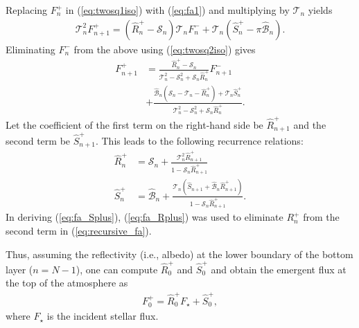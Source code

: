 Replacing $F_n^+$ in (\ref{eq:twosq1iso}) with (\ref{eq:fa1}) and multiplying by $\mathcal{T}_n$ yields
\begin{align}
    \mathcal{T}_n^2 F_{n+1}^+ = (\hat{R}_n^+ - \mathcal{S}_n) \mathcal{T}_n F_n^- + \mathcal{T}_n (\hat{S}_n^+ - \pi \hat{\mathcal{B}}_n).
\end{align}
Eliminating $F_n^-$ from the above using (\ref{eq:twosq2iso}) gives
\begin{align}
    \label{eq:recursive_fa}
    F_{n+1}^+ &= \frac{\hat{R}_n^+ - \mathcal{S}_n}{  \mathcal{T}_n^2 -\mathcal{S}_n^2 +  \mathcal{S}_n \hat{R}_n^+} F_{n+1}^- \nonumber \\
    &+ \frac{\hat{\mathcal{B}}_n(\mathcal{S}_n - \mathcal{T}_n- \hat{R}_n^+ ) + \mathcal{T}_n \hat{S}_n^+}{  \mathcal{T}_n^2 -\mathcal{S}_n^2 +  \mathcal{S}_n \hat{R}_n^+}.
\end{align}
Let the coefficient of the first term on the right-hand side be $\hat{R}_{n+1}^+$ and the second term be $\hat{S}_{n+1}^+$. This leads to the following recurrence relations:
\begin{align}
    \label{eq:fa_Rplus}
    \hat{R}_n^+ &= \mathcal{S}_n + \frac{\mathcal{T}_n^2 \hat{R}_{n+1}^+}{1-\mathcal{S}_n \hat{R}_{n+1}^+} \\
    \label{eq:fa_Splus}
    \hat{S}_n^+ &= \hat{\mathcal{B}}_n + \frac{\mathcal{T}_n (\hat{S}_{n+1} + \hat{\mathcal{B}}_n \hat{R}_{n+1}^+)}{1 - \mathcal{S}_n \hat{R}_{n+1}^+}.
\end{align}
In deriving (\ref{eq:fa_Splus}), (\ref{eq:fa_Rplus}) was used to eliminate $R_n^+$ from the second term in (\ref{eq:recursive_fa}).

Thus, assuming the reflectivity (i.e., albedo) at the lower boundary of the bottom layer ($n=N-1$), one can compute $\hat{R}^+_0$ and $\hat{S}^+_0$ and obtain the emergent flux at the top of the atmosphere as
\begin{align}
    F_0^+ = \hat{R}^+_0 F_\star + \hat{S}^+_0,
\end{align}
where $F_\star$ is the incident stellar flux.

